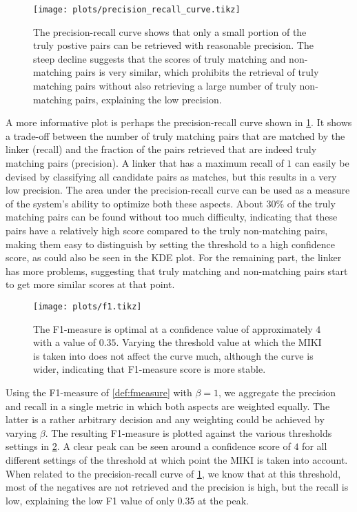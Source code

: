 \begin{figure}
    \centering
    \texttt{[image: plots/precision\_recall\_curve.tikz]}
   \caption{The precision-recall curve shows that only a small portion of the truly postive pairs can be retrieved with reasonable precision. The steep decline suggests that the scores of truly matching and non-matching pairs is very similar, which prohibits the retrieval of truly matching pairs without also retrieving a large number of truly non-matching pairs, explaining the low precision.}
    \label{fig:precision_recall}
\end{figure}

A more informative plot is perhaps the precision-recall curve shown in \cref{fig:precision_recall}.
It shows a trade-off between the number of truly matching pairs that are matched by the linker (recall) and the fraction of the pairs retrieved that are indeed truly matching pairs (precision).
A linker that has a maximum recall of $1$ can easily be devised by classifying all candidate pairs as matches, but this results in a very low precision.
The area under the precision-recall curve can be used as a measure of the system's ability to optimize both these aspects.
About $30\%$ of the truly matching pairs can be found without too much difficulty, indicating that these pairs have a relatively high score compared to the truly non-matching pairs, making them easy to distinguish by setting the threshold to a high confidence score, as could also be seen in the KDE plot.
For the remaining part, the linker has more problems, suggesting that truly matching and non-matching pairs start to get more similar scores at that point.

\begin{figure}
    \centering
    \texttt{[image: plots/f1.tikz]}
    \caption{The F1-measure is optimal at a confidence value of approximately $4$ with a value of $0.35$. Varying the threshold value at which the MIKI is taken into does not affect the curve much, although the curve is wider, indicating that F1-measure score is more stable.}
    \label{fig:f1}
\end{figure}

Using the F1-measure of \cref{def:fmeasure} with $\beta = 1$, we aggregate the precision and recall in a single metric in which both aspects are weighted equally.
The latter is a rather arbitrary decision and any weighting could be achieved by varying $\beta$.
The resulting F1-measure is plotted against the various thresholds settings in \cref{fig:f1}.
A clear peak can be seen around a confidence score of $4$ for all different settings of the threshold at which point the MIKI is taken into account.
When related to the precision-recall curve of \cref{fig:precision_recall}, we know that at this threshold, most of the negatives are not retrieved and the precision is high, but the recall is low, explaining the low F1 value of only $0.35$ at the peak.